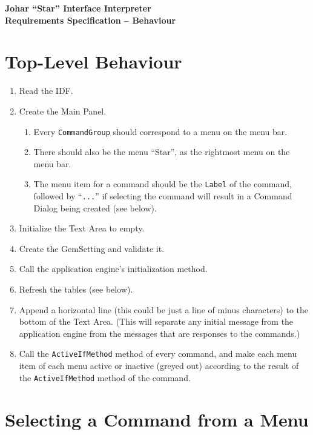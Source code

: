 \documentclass[11pt]{article}
\begin{document}
\begin{center} \bf \Large
Johar ``Star'' Interface Interpreter \\
Requirements Specification -- Behaviour
\end{center}

\section{Top-Level Behaviour}

\begin{enumerate}
\item Read the IDF.
\item Create the Main Panel.
  \begin{enumerate}
  \item Every {\tt CommandGroup} should correspond to a menu on the
    menu bar.
  \item There should also be the menu ``Star'', as the rightmost menu on the
    menu bar.
  \item The menu item for a command should be the {\tt Label}
    of the command, followed by ``{\tt ...}'' if selecting the 
    command will result in a Command Dialog being created (see below).
  \end{enumerate}
\item Initialize the Text Area to empty.
\item Create the GemSetting and validate it.
\item Call the application engine's initialization method.
\item Refresh the tables (see below).
\item Append a horizontal line (this could be just a line of minus
  characters) to the bottom of the Text Area.  (This will separate any
  initial message from the application engine from the messages that are
  responses to the commands.)
\item Call the {\tt ActiveIfMethod} method of every command, and make each menu
  item of each menu active or inactive (greyed out) according to the
  result of the {\tt ActiveIfMethod} method of the command.
\end{enumerate}

\section{Selecting a Command from a Menu}
\end{document}
